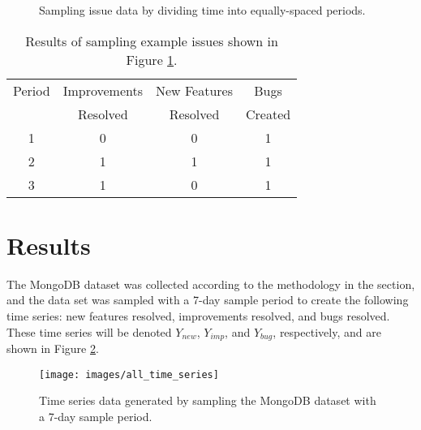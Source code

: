 \documentclass[a4paper]{scrartcl}
\begin{document}
\begin{figure}[h!]
\begin{center}
\caption{Sampling issue data by dividing time into equally-spaced periods.}
\label{fig:sampling_issue_data}
\end{center}
\end{figure}

\begin{table}[h!]
\caption{Results of sampling example issues shown in Figure \ref{fig:sampling_issue_data}.}
\centering
\begin{tabular}{ c | c | c | c }
\hline
Period & Improvements & New Features & Bugs \\
~& Resolved & Resolved & Created \\
\hline
1 & 0 & 0 & 1 \\
2 & 1 & 1 & 1 \\
3 & 1 & 0 & 1 \\
\hline
\end{tabular}
\label{tab:sampling_issue_data}
\end{table}


\section*{Results}
\label{sec:results}

The MongoDB dataset was collected according to the methodology in the  section, and the data set was sampled with a 7-day sample period to create the following time series: new features resolved, improvements resolved, and bugs resolved. These time series will be denoted $Y_{new}$, $Y_{imp}$, and $Y_{bug}$, respectively, and are shown in Figure \ref{fig:all_time_series}.

\begin{figure}[htbp!]
\begin{center}
\texttt{[image: images/all\_time\_series]}
\caption{Time series data generated by sampling the MongoDB dataset with a 7-day sample period.}
\label{fig:all_time_series}
\end{center}
\end{figure}
\end{document}
